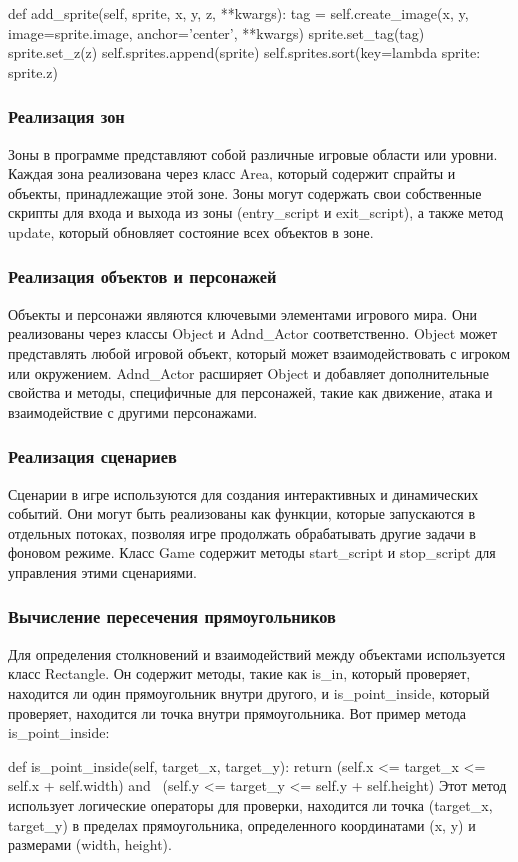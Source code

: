 def add\_sprite(self, sprite, x, y, z, **kwargs):
tag = self.create\_image(x, y, image=sprite.image, anchor='center', **kwargs)
sprite.set\_tag(tag)
sprite.set\_z(z)
self.sprites.append(sprite)
self.sprites.sort(key=lambda sprite: sprite.z)
\subsubsection{Реализация зон}
Зоны в программе представляют собой различные игровые области или уровни. Каждая зона реализована через класс Area, который содержит спрайты и объекты, принадлежащие этой зоне. Зоны могут содержать свои собственные скрипты для входа и выхода из зоны (entry\_script и exit\_script), а также метод update, который обновляет состояние всех объектов в зоне.
\subsubsection{Реализация объектов и персонажей}
Объекты и персонажи являются ключевыми элементами игрового мира. Они реализованы через классы Object и Adnd\_Actor соответственно. Object может представлять любой игровой объект, который может взаимодействовать с игроком или окружением. Adnd\_Actor расширяет Object и добавляет дополнительные свойства и методы, специфичные для персонажей, такие как движение, атака и взаимодействие с другими персонажами.
\subsubsection{Реализация сценариев}
Сценарии в игре используются для создания интерактивных и динамических событий. Они могут быть реализованы как функции, которые запускаются в отдельных потоках, позволяя игре продолжать обрабатывать другие задачи в фоновом режиме. Класс Game содержит методы start\_script и stop\_script для управления этими сценариями.
\subsubsection{Вычисление пересечения прямоугольников}
Для определения столкновений и взаимодействий между объектами используется класс Rectangle. Он содержит методы, такие как is\_in, который проверяет, находится ли один прямоугольник внутри другого, и is\_point\_inside, который проверяет, находится ли точка внутри прямоугольника. Вот пример метода is\_point\_inside:

def is\_point\_inside(self, target\_x, target\_y):
return (self.x <= target\_x <= self.x + self.width) and \
(self.y <= target\_y <= self.y + self.height)
Этот метод использует логические операторы для проверки, находится ли точка (target\_x, target\_y) в пределах прямоугольника, определенного координатами (x, y) и размерами (width, height).

